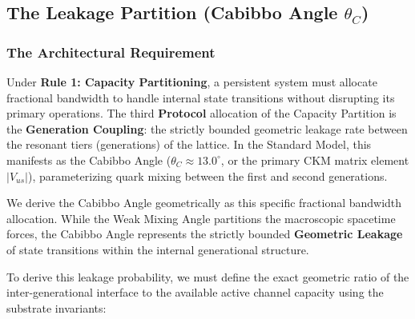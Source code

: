 

\subsection{The Leakage Partition (Cabibbo Angle \texorpdfstring{$\theta_C$}{thetaC})}
\label{subsec:generation_coupling}
\label{subsec:cabibbo}

\subsubsection{The Architectural Requirement}
Under \textbf{Rule 1: Capacity Partitioning}, a persistent system must allocate fractional bandwidth to handle internal state transitions without disrupting its primary operations. The third \textbf{Protocol} allocation of the Capacity Partition is the \textbf{Generation Coupling}: the strictly bounded geometric leakage rate between the resonant tiers (generations) of the lattice. In the Standard Model, this manifests as the Cabibbo Angle ($\theta_C \approx 13.0^\circ$, or the primary CKM matrix element $|V_{us}|$), parameterizing quark mixing between the first and second generations.

We derive the Cabibbo Angle geometrically as this specific fractional bandwidth allocation. While the Weak Mixing Angle partitions the macroscopic spacetime forces, the Cabibbo Angle represents the strictly bounded \textbf{Geometric Leakage} of state transitions within the internal generational structure.

To derive this leakage probability, we must define the exact geometric ratio of the inter-generational interface to the available active channel capacity using the substrate invariants:

